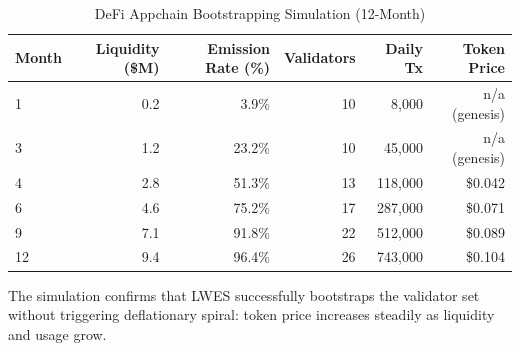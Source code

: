\begin{table}[H]
\centering
\caption{DeFi Appchain Bootstrapping Simulation (12-Month)}
\label{tab:bootstrap_sim}
\begin{tabular}{lrrrrr}
\toprule
\textbf{Month} & \textbf{Liquidity (\$M)} & \textbf{Emission Rate (\%)} & \textbf{Validators} & \textbf{Daily Tx} & \textbf{Token Price} \\
\midrule
1 & 0.2 & 3.9\% & 10 & 8,000 & n/a (genesis) \\
3 & 1.2 & 23.2\% & 10 & 45,000 & n/a (genesis) \\
4 & 2.8 & 51.3\% & 13 & 118,000 & \$0.042 \\
6 & 4.6 & 75.2\% & 17 & 287,000 & \$0.071 \\
9 & 7.1 & 91.8\% & 22 & 512,000 & \$0.089 \\
12 & 9.4 & 96.4\% & 26 & 743,000 & \$0.104 \\
\bottomrule
\end{tabular}
\end{table}

The simulation confirms that LWES successfully bootstraps the validator set without
triggering deflationary spiral: token price increases steadily as liquidity and usage grow.

